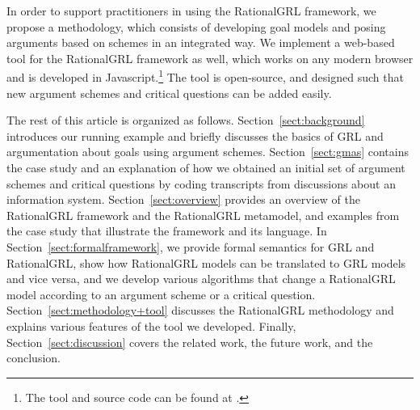 In order to support practitioners in using the RationalGRL framework, we propose a methodology, which consists of developing goal models and posing arguments based on schemes in an integrated way. We implement a web-based tool for the RationalGRL framework as well, which works on any modern browser and is developed in Javascript.\footnote{The tool and source code can be found at \rationalgrlurl.} The tool is open-source, and designed such that new argument schemes and critical questions can be added easily.

The rest of this article is organized as follows. Section~\ref{sect:background} introduces our running example and briefly discusses the basics of GRL and argumentation about goals using argument schemes. Section~\ref{sect:gmas} contains the case study and an explanation of how we obtained an initial set of argument schemes and critical questions by coding transcripts from discussions about an information system. Section~\ref{sect:overview} provides an overview of the RationalGRL framework and the RationalGRL metamodel, and examples from the case study that illustrate the framework and its language. In Section~\ref{sect:formalframework}, we provide formal semantics for GRL and RationalGRL, show how RationalGRL models can be translated to GRL models and vice versa, and we develop various algorithms that change a RationalGRL model according to an argument scheme or a critical question. Section~\ref{sect:methodology+tool} discusses the RationalGRL methodology and explains various features of the tool we developed. Finally, Section~\ref{sect:discussion} covers the related work, the future work, and the conclusion.
